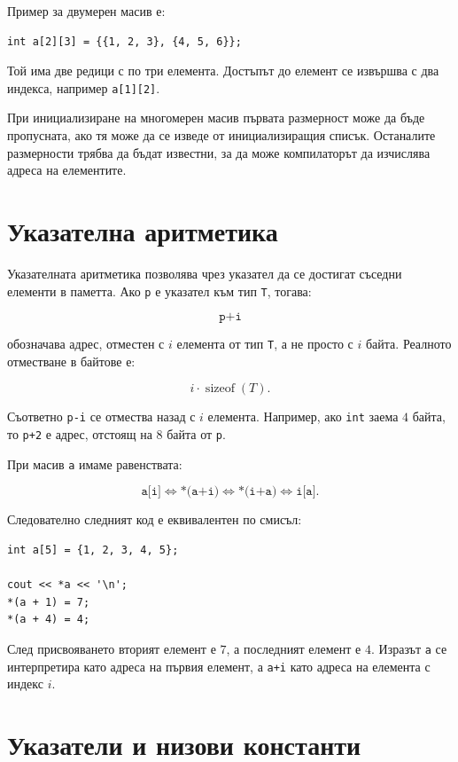 Пример за двумерен масив е:

\begin{verbatim}
int a[2][3] = {{1, 2, 3}, {4, 5, 6}};
\end{verbatim}

Той има две редици с по три елемента. Достъпът до елемент се извършва с два индекса, например \texttt{a[1][2]}.

При инициализиране на многомерен масив първата размерност може да бъде пропусната, ако тя може да се изведе от инициализиращия списък. Останалите размерности трябва да бъдат известни, за да може компилаторът да изчислява адреса на елементите.

\section{Указателна аритметика}\label{s:15.3}

Указателната аритметика позволява чрез указател да се достигат съседни елементи в паметта. Ако \texttt{p} е указател към тип \texttt{T}, тогава:

\[
\texttt{p+i}
\]

обозначава адрес, отместен с $i$ елемента от тип \texttt{T}, а не просто с $i$ байта. Реалното отместване в байтове е:

\[
i\cdot\operatorname{sizeof}(T).
\]

Съответно \texttt{p-i} се отмества назад с $i$ елемента. Например, ако \texttt{int} заема $4$ байта, то \texttt{p+2} е адрес, отстоящ на $8$ байта от \texttt{p}.

При масив \texttt{a} имаме равенствата:

\[
\texttt{a[i]}\Longleftrightarrow\texttt{*(a+i)}
\Longleftrightarrow\texttt{*(i+a)}
\Longleftrightarrow\texttt{i[a]}.
\]

Следователно следният код е еквивалентен по смисъл:

\begin{verbatim}
int a[5] = {1, 2, 3, 4, 5};

cout << *a << '\n';
*(a + 1) = 7;
*(a + 4) = 4;
\end{verbatim}

След присвояването вторият елемент е $7$, а последният елемент е $4$. Изразът \texttt{a} се интерпретира като адреса на първия елемент, а \texttt{a+i} като адреса на елемента с индекс $i$.

\section{Указатели и низови константи}\label{s:15.4}

